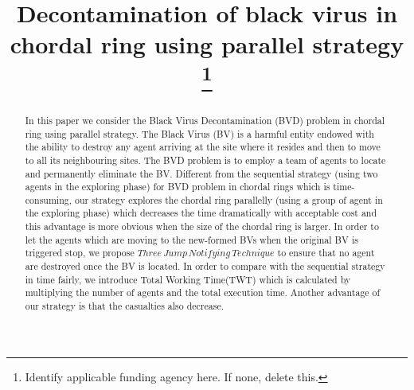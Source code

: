 \documentclass[conference]{IEEEtran}
\begin{document}
\title{Decontamination of black virus in chordal ring using parallel strategy
\\
{\footnotesize \textsuperscript{}}
\thanks{Identify applicable funding agency here. If none, delete this.}
}

\author{
\and
{}
\and
{}
}

\maketitle

\begin{abstract}
In this paper we consider the Black Virus Decontamination (BVD) problem in chordal ring using parallel strategy. The Black Virus (BV) is a harmful entity endowed with the ability to destroy any agent arriving at the site where it resides and then to move to all its neighbouring sites. The BVD problem is to employ a team of agents to locate and permanently eliminate the BV. Different from the sequential strategy (using two agents in the exploring phase) for BVD problem in chordal rings which is time-consuming, our strategy explores the chordal ring parallelly (using a group of agent in the exploring phase) which decreases the time dramatically with acceptable cost and this advantage is more obvious when the size of the chordal ring is larger. In order to let the agents which are moving to the new-formed BVs when the original BV is triggered stop, we propose $Three\,Jump\,Notifying\,Technique$ to ensure that no agent are destroyed once the BV is located. In order to compare with the sequential strategy in time fairly, we introduce Total Working Time(TWT) which is calculated by multiplying the number of agents and the total execution time. Another advantage of our strategy is that the casualties also decrease.\end{abstract}
\end{document}
